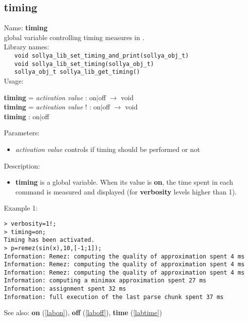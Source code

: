 \subsection{timing}
\label{labtiming}
\noindent Name: \textbf{timing}\\
\phantom{aaa}global variable controlling timing measures in \sollya.\\[0.2cm]
\noindent Library names:\\
\verb|   void sollya_lib_set_timing_and_print(sollya_obj_t)|\\
\verb|   void sollya_lib_set_timing(sollya_obj_t)|\\
\verb|   sollya_obj_t sollya_lib_get_timing()|\\[0.2cm]
\noindent Usage: 
\begin{center}
\textbf{timing} = \emph{activation value} : \textsf{on$|$off} $\rightarrow$ \textsf{void}\\
\textbf{timing} = \emph{activation value} ! : \textsf{on$|$off} $\rightarrow$ \textsf{void}\\
\textbf{timing} : \textsf{on$|$off}\\
\end{center}
Parameters: 
\begin{itemize}
\item \emph{activation value} controls if timing should be performed or not
\end{itemize}
\noindent Description: \begin{itemize}

\item \textbf{timing} is a global variable. When its value is \textbf{on}, the time spent in each 
   command is measured and displayed (for \textbf{verbosity} levels higher than 1).
\end{itemize}
\noindent Example 1: 
\begin{center}\begin{minipage}{15cm}\begin{Verbatim}[frame=single]
> verbosity=1!;
> timing=on;
Timing has been activated.
> p=remez(sin(x),10,[-1;1]);
Information: Remez: computing the quality of approximation spent 4 ms
Information: Remez: computing the quality of approximation spent 4 ms
Information: Remez: computing the quality of approximation spent 4 ms
Information: computing a minimax approximation spent 27 ms
Information: assignment spent 32 ms
Information: full execution of the last parse chunk spent 37 ms
\end{Verbatim}
\end{minipage}\end{center}
See also: \textbf{on} (\ref{labon}), \textbf{off} (\ref{laboff}), \textbf{time} (\ref{labtime})
